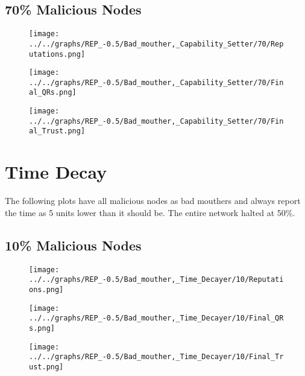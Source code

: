 \begin{minipage}[t]{0.49\columnwidth}
\subsection*{70\% Malicious Nodes}
    \begin{figure}[H]
        \centering
        \texttt{[image: ../../graphs/REP\_-0.5/Bad\_mouther,\_Capability\_Setter/70/Reputations.png]}
    \end{figure}
    \begin{figure}[H]
        \centering
        \texttt{[image: ../../graphs/REP\_-0.5/Bad\_mouther,\_Capability\_Setter/70/Final\_QRs.png]}
    \end{figure}
\end{minipage}
\begin{minipage}[t]{0.49\columnwidth}
    \begin{figure}[H]
        \centering
        \texttt{[image: ../../graphs/REP\_-0.5/Bad\_mouther,\_Capability\_Setter/70/Final\_Trust.png]}
    \end{figure}
\end{minipage}
\newpage

\section*{Time Decay}
The following plots have all malicious nodes as bad mouthers and always
report the time as 5 units lower than it should be. The entire network halted
at 50\%.
\\
\begin{minipage}[t]{0.49\columnwidth}
\subsection*{10\% Malicious Nodes}
    \begin{figure}[H]
        \centering
        \texttt{[image: ../../graphs/REP\_-0.5/Bad\_mouther,\_Time\_Decayer/10/Reputations.png]}
    \end{figure}
    \begin{figure}[H]
        \centering
        \texttt{[image: ../../graphs/REP\_-0.5/Bad\_mouther,\_Time\_Decayer/10/Final\_QRs.png]}
    \end{figure}
\end{minipage}
\begin{minipage}[t]{0.49\columnwidth}
    \begin{figure}[H]
        \centering
        \texttt{[image: ../../graphs/REP\_-0.5/Bad\_mouther,\_Time\_Decayer/10/Final\_Trust.png]}
    \end{figure}
\end{minipage}

